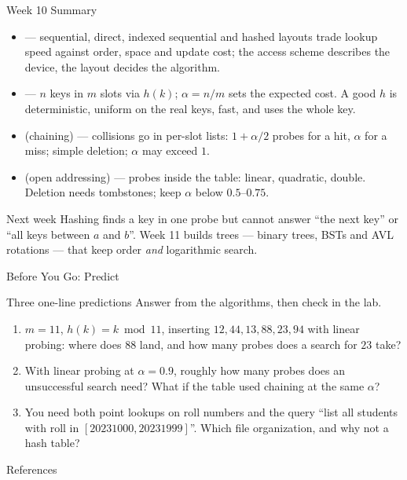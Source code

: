 \documentclass[aspectratio=169]{beamer}
\begin{document}
\begin{frame}{Week 10 Summary}
  \begin{itemize}
    \item {} --- sequential, direct, indexed sequential
      and hashed layouts trade lookup speed against order, space and update
      cost; the access scheme describes the device, the layout decides the
      algorithm.
    \item {} --- $n$ keys in $m$ slots via $h(k)$; $\alpha=n/m$
      sets the expected cost. A good $h$ is deterministic, uniform on the real
      keys, fast, and uses the whole key.
    \item {} (chaining) --- collisions go in per-slot lists:
      $1+\alpha/2$ probes for a hit, $\alpha$ for a miss; simple deletion;
      $\alpha$ may exceed $1$.
    \item {} (open addressing) --- probes inside the table:
      linear, quadratic, double. Deletion needs tombstones; keep $\alpha$
      below $0.5$--$0.75$.
  \end{itemize}
  \begin{exampleblock}{Next week}
    Hashing finds a key in one probe but cannot answer ``the next key'' or
    ``all keys between $a$ and $b$''. Week 11 builds trees --- binary trees,
    BSTs and AVL rotations --- that keep order \emph{and} logarithmic search.
  \end{exampleblock}
  \vspace{-0.2cm}
\end{frame}

\begin{frame}{Before You Go: Predict}
  \begin{block}{Three one-line predictions}
    Answer from the algorithms, then check in the lab.
  \end{block}
  \begin{enumerate}
    \item $m=11$, $h(k)=k\bmod 11$, inserting $12,44,13,88,23,94$ with linear
      probing: where does $88$ land, and how many probes does a search for
      $23$ take?
    \item With linear probing at $\alpha=0.9$, roughly how many probes does an
      unsuccessful search need? What if the table used chaining at the same
      $\alpha$?
    \item You need both point lookups on roll numbers and the query ``list
      all students with roll in $[20231000,20231999]$''. Which file
      organization, and why not a hash table?
  \end{enumerate}
\end{frame}

\begin{frame}[allowframebreaks]{References}
  \tiny
  
  
\end{frame}
\end{document}
